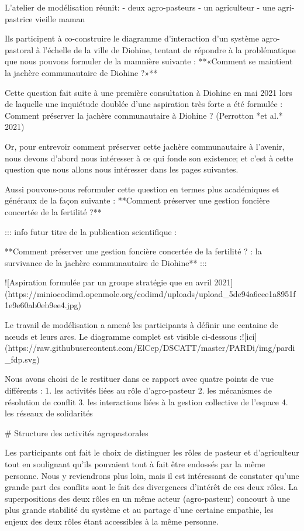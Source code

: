 L'atelier de modélisation réunit:
- deux agro-pasteurs
- un agriculteur
- une agri-pastrice vieille maman 

Ils participent à co-construire le diagramme d'interaction d'un système agro-pastoral à l'échelle de la ville de Diohine, tentant de répondre à la problématique que nous pouvons formuler de la mamnière suivante : **«Comment se maintient la jachère communautaire de Diohine ?»**

Cette question fait suite à une première consultation à Diohine en mai 2021 lors de laquelle une inquiétude doublée d'une aspiration très forte a été formulée : Comment préserver la jachère communautaire à Diohine ? (Perrotton *et al.* 2021) 

Or, pour entrevoir comment préserver cette jachère communautaire à l'avenir, nous devons d'abord nous intéresser à ce qui fonde son existence; et c'est à cette question que nous allons nous intéresser dans les pages suivantes. 


Aussi pouvons-nous reformuler cette question en termes plus académiques et généraux de la façon suivante :  
**Comment préserver une gestion foncière concertée de la fertilité ?**

::: info
futur titre de la publication scientifique : 

**Comment préserver une gestion foncière concertée de la fertilité ? : la survivance de la jachère communautaire de Diohine**
:::


![Aspiration formulée par un groupe stratégie que en avril 2021](https://miniocodimd.openmole.org/codimd/uploads/upload_5de94a6cee1a8951f1e9e60ab0eb9ee4.jpg)




Le travail de modélisation a amené les participants à définir une centaine de nœuds et leurs arcs. Le diagramme complet est visible ci-dessous :![ici](https://raw.githubusercontent.com/ElCep/DSCATT/master/PARDi/img/pardi_fdp.svg)

Nous avons choisi de le restituer dans ce rapport avec quatre points de vue différents : 
1. les activités liées au rôle d'agro-pasteur
2. les mécanismes de résolution de conflit
3. les interactions liées à la gestion collective de l'espace
4. les réseaux de solidarités

# Structure des activités agropastorales 

Les participants ont fait le choix de distinguer les rôles de pasteur et d'agriculteur tout en soulignant qu'ils pouvaient tout à fait être endossés par la même personne. Nous y reviendrons plus loin, mais il est intéressant de constater qu'une grande part des conflits sont le fait des divergences d'intérêt de ces deux rôles. La superpositions des deux rôles en un même acteur (agro-pasteur) concourt à une plus grande stabilité du système et au partage d'une certaine empathie, les enjeux des deux rôles étant accessibles à la même personne.

